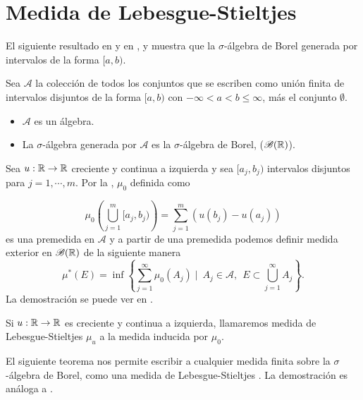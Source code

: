 \section{Medida de Lebesgue-Stieltjes}

El siguiente resultado  en \cite[Proposición 1.2]{folland} y en \cite[Proposición 1.7]{folland}, y muestra que la $\sigma$-álgebra de Borel  generada por intervalos de la forma $[a,b)$.

\begin{prop}\label{prop:algebra de borel}Sea $\mathcal{A}$ la colección de todos los conjuntos que se escriben como unión finita de intervalos disjuntos de la forma $[a,b)$ con $-\infty<a<b\leq\infty$, más el conjunto $\emptyset$.
	\begin{itemize}
		\item $\mathcal{A}$ es un álgebra.
		\item La $\sigma$-álgebra generada por $\mathcal{A}$ es la $\sigma$-álgebra de Borel, ($\mathscr{B}(\mathbb{R})$).
	\end{itemize}
\end{prop}

Sea $u:\mathbb{R} \to \mathbb{R}$  creciente y continua a izquierda y sea $[a_j,b_j)$ intervalos disjuntos para $j=1, \cdots ,m$. Por la \cite[Proposición 1.15]{folland},  $\mu_{0}$ definida como 

$$\mu_{0}\left( \bigcup_{j=1}^m[a_j,b_j)\right)  =\sum_{j=1}^{m}\left(u(b_j)-u(a_j)\right) $$
es una premedida  en $\mathcal{A}$ y a partir de una premedida podemos definir  medida exterior en $\mathscr{B}(\mathbb{R})$ de la siguiente manera 
$$\mu^{*}(E)=\inf\left\lbrace \sum_{ j=1 }^{\infty}\mu_{0}(A_j) \mid \ A_j\in \mathcal{A}, \ \  E\subset\bigcup_{j=1}^{\infty}A_j \right\rbrace. $$\index[Simbolo]{$\mu^{*}$}
La demostración se puede ver en \cite[Proposición 1.13]{folland}.
\begin{defi}
	Si $u:\mathbb{R} \to \mathbb{R}$ es creciente y continua a izquierda, llamaremos medida de Lebesgue-Stieltjes $\mu_{u}$ a la medida inducida por $\mu_{0}$. 
\end{defi}

El siguiente teorema nos permite escribir a cualquier medida finita sobre la $\sigma$-álgebra de Borel, como una medida de Lebesgue-Stieltjes  . La demostración es análoga a  \cite[Teorema  1.16]{folland}.

